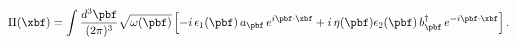 \begin{equation}
\Pi ({\xbf}) = \int \frac{d^{3}{\pbf}}{(2\pi)^3} 
\sqrt{\omega(\pbf)} \left[- i\,\epsilon_1(\pbf) \, a_{\pbf} \, 
e^{i{\pbf}\cdot{\xbf}} + 
i\,\eta(\pbf) \epsilon_2(\pbf) \, b^{\dagger}_{\pbf} \, 
e^{- i{\pbf}\cdot{\xbf}}\right].
\label{Pi}
\end{equation}

